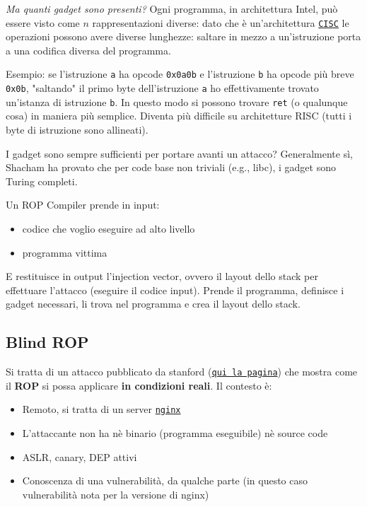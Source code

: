 \textit{Ma quanti gadget sono presenti?} Ogni programma, in architettura Intel, può essere visto come $n$ rappresentazioni diverse: dato che è un'architettura \href{https://it.wikipedia.org/wiki/Complex_instruction_set_computer}{\texttt{CISC}} le operazioni possono avere diverse lunghezze: saltare in mezzo a un'istruzione porta a una codifica diversa del programma.

Esempio: se l'istruzione \texttt{a} ha opcode \texttt{0x0a0b} e l'istruzione \texttt{b} ha opcode più breve \texttt{0x0b}, "saltando" il primo byte dell'istruzione \texttt{a} ho effettivamente trovato un'istanza di istruzione \texttt{b}. In questo modo si possono trovare \texttt{ret} (o qualunque cosa) in maniera più semplice. Diventa più difficile su architetture RISC (tutti i byte di istruzione sono allineati).

I gadget sono sempre sufficienti per portare avanti un attacco? Generalmente sì, Shacham ha provato che per code base non triviali (e.g., libc), i gadget sono Turing completi.

Un ROP Compiler prende in input:
\begin{itemize}
	\item codice che voglio eseguire ad alto livello
    
	\item programma vittima
\end{itemize}

E restituisce in output l'injection vector, ovvero il layout dello stack per effettuare l'attacco (eseguire il codice input). Prende il programma, definisce i gadget necessari, li trova nel programma e crea il layout dello stack.

\subsection{Blind ROP}

Si tratta di un attacco pubblicato da stanford (\href{http://www.scs.stanford.edu/brop/}{\texttt{qui la pagina}}) che mostra come il \textbf{ROP} si possa applicare \textbf{in condizioni reali}. Il contesto è: 
\begin{itemize}
	\item Remoto, si tratta di un server \href{https://nginx.org/}{\texttt{nginx}}
    
	\item L'attaccante non ha nè binario (programma eseguibile) nè source code
    
	\item ASLR, canary, DEP attivi
    
	\item Conoscenza di una vulnerabilità, da qualche parte (in questo caso vulnerabilità nota per la versione di nginx)
\end{itemize}

